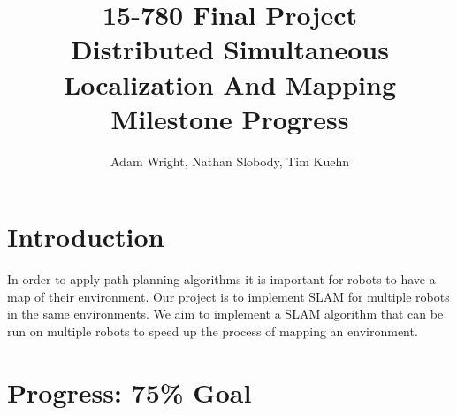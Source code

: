 \documentclass[11pt]{article}
\title{
15-780 Final Project \\ 
Distributed Simultaneous Localization And Mapping \\
Milestone Progress
}
\author{Adam Wright, Nathan Slobody, Tim Kuehn}
\begin{document}
\maketitle

\section{Introduction}

In order to apply path planning algorithms it is important for robots to have a map of their environment. Our project is to implement SLAM for multiple robots in the same environments. We aim to implement a SLAM algorithm that can be run on multiple robots to speed up the process of mapping an environment. 

\section{Progress: 75\% Goal}
\end{document}
